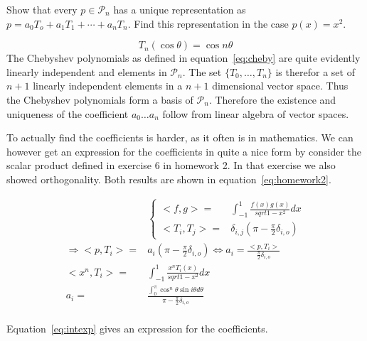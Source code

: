 \begin{problem}
  Show that every $p \in \mathcal{P}_n$ has a unique representation as
  $p = a_0 T_o + a_1 T_1 + \cdots + a_n T_n$. Find this representation
  in the case $p(x) = x^2$.
\end{problem}

\begin{solution}
  \begin{equation}
    \label{eq:cheby} T_n(\cos{\theta}) = \cos{n\theta}
  \end{equation} The Chebyshev polynomials as defined in
  equation~\ref{eq:cheby} are quite evidently linearly independent and
  elements in $\mathcal{P}_n$. The set $\{ T_0, \dots , T_n\}$ is
  therefor a set of $n+1$ linearly independent elements in a $n+1$
  dimensional vector space. Thus the Chebyshev polynomials form a basis
  of $\mathcal{P}_n$. Therefore the existence and uniqueness of the
  coefficient $a_0 \dots a_n$ follow from linear algebra of vector
  spaces.

  To actually find the coefficients is harder, as it often is in
  mathematics. We can however get an expression for the coefficients in
  quite a nice form by consider the scalar product defined in exercise 6
  in homework 2. In that exercise we also showed orthogonality. Both
  results are shown in equation~\ref{eq:homework2}.

  \begin{align}
    \label{eq:homework2}
    & \begin{cases}
      <f, g> = & \int_{-1}^{1} \frac{f(x) g(x)}{sqrt{1 - x^2}} dx \\
      <T_i, T_j> = & \delta_{i,j} ( \pi - \frac{\pi}{2}\delta_{i,o} )
    \end{cases} \\
    \nonumber
    \Rightarrow <p, T_i> =  & a_i ( \pi - \frac{\pi}{2}\delta_{i,o} ) 
                              \Leftrightarrow a_i =
                              \frac{<p,T_i>}{\frac{\pi}{2}\delta_{i,o}} \\
    \nonumber 
    <x^n, T_i>  = & \int_{-1}^{1} \frac{x^n T_i(x)}{sqrt{1 - x^2}} dx
    \\
    \label{eq:intexp} 
    a_i = & \frac{\int_0^\pi \cos^{n}\theta \sin{i\theta} d\theta}{\pi
            - \frac{\pi}{2}\delta_{i,o}} \\
  \end{align}

  Equation~\ref{eq:intexp} gives an expression for the coefficients.  
  
\end{solution}




